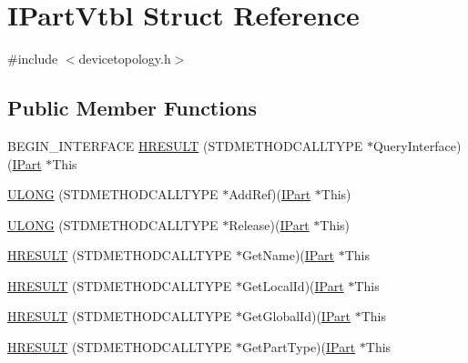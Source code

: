 \hypertarget{struct_i_part_vtbl}{}\section{I\+Part\+Vtbl Struct Reference}
\label{struct_i_part_vtbl}


{\ttfamily \#include $<$devicetopology.\+h$>$}

\subsection*{Public Member Functions}
\begin{DoxyCompactItemize}
\item 
B\+E\+G\+I\+N\+\_\+\+I\+N\+T\+E\+R\+F\+A\+CE \hyperlink{struct_i_part_vtbl_a819544ebc01bd68cae1c97db3bb7ce92}{H\+R\+E\+S\+U\+LT} (S\+T\+D\+M\+E\+T\+H\+O\+D\+C\+A\+L\+L\+T\+Y\+PE $\ast$Query\+Interface)(\hyperlink{devicetopology_8h_adabb5bd8e19759521e1498eef1d0b56f}{I\+Part} $\ast$This
\item 
\hyperlink{struct_i_part_vtbl_a2fbd5ed086ed4db730bc3c0490ede8c6}{U\+L\+O\+NG} (S\+T\+D\+M\+E\+T\+H\+O\+D\+C\+A\+L\+L\+T\+Y\+PE $\ast$Add\+Ref)(\hyperlink{devicetopology_8h_adabb5bd8e19759521e1498eef1d0b56f}{I\+Part} $\ast$This)
\item 
\hyperlink{struct_i_part_vtbl_aac24224040e2de52ce540909f272bf26}{U\+L\+O\+NG} (S\+T\+D\+M\+E\+T\+H\+O\+D\+C\+A\+L\+L\+T\+Y\+PE $\ast$Release)(\hyperlink{devicetopology_8h_adabb5bd8e19759521e1498eef1d0b56f}{I\+Part} $\ast$This)
\item 
\hyperlink{struct_i_part_vtbl_af6c0bcbcd4ab04f420109909c04390ff}{H\+R\+E\+S\+U\+LT} (S\+T\+D\+M\+E\+T\+H\+O\+D\+C\+A\+L\+L\+T\+Y\+PE $\ast$Get\+Name)(\hyperlink{devicetopology_8h_adabb5bd8e19759521e1498eef1d0b56f}{I\+Part} $\ast$This
\item 
\hyperlink{struct_i_part_vtbl_a6edb5fd76c7d649e0f7cb1b09e963317}{H\+R\+E\+S\+U\+LT} (S\+T\+D\+M\+E\+T\+H\+O\+D\+C\+A\+L\+L\+T\+Y\+PE $\ast$Get\+Local\+Id)(\hyperlink{devicetopology_8h_adabb5bd8e19759521e1498eef1d0b56f}{I\+Part} $\ast$This
\item 
\hyperlink{struct_i_part_vtbl_a43de4c749271c4ea80b57f45f464190b}{H\+R\+E\+S\+U\+LT} (S\+T\+D\+M\+E\+T\+H\+O\+D\+C\+A\+L\+L\+T\+Y\+PE $\ast$Get\+Global\+Id)(\hyperlink{devicetopology_8h_adabb5bd8e19759521e1498eef1d0b56f}{I\+Part} $\ast$This
\item 
\hyperlink{struct_i_part_vtbl_aa82cbc57312fc0f843d9570e4e72ae2e}{H\+R\+E\+S\+U\+LT} (S\+T\+D\+M\+E\+T\+H\+O\+D\+C\+A\+L\+L\+T\+Y\+PE $\ast$Get\+Part\+Type)(\hyperlink{devicetopology_8h_adabb5bd8e19759521e1498eef1d0b56f}{I\+Part} $\ast$This

\end{DoxyCompactItemize}
